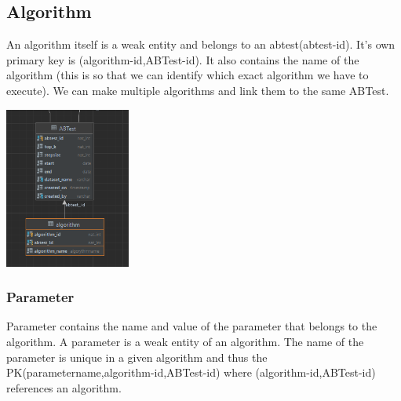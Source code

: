 \documentclass[a4paper,12pt]{article}
\begin{document}
	\subsection{Algorithm} An algorithm itself is a weak entity and belongs to an abtest(abtest-id). It's own primary key is (algorithm-id,ABTest-id). It also contains the name of the algorithm (this is so that we can identify which exact algorithm we have to execute). We can make multiple algorithms and link them to the same ABTest.
\begin{center}

		\includegraphics[height={200px}]{Algorithm.png}
	
\end{center}			
	\subsubsection{Parameter} Parameter contains the name and value of the parameter that belongs to the algorithm. A parameter is a weak entity of an algorithm. The name of the parameter is unique in a given algorithm and thus the PK(parametername,algorithm-id,ABTest-id) where (algorithm-id,ABTest-id) references an algorithm. 
\end{document}
